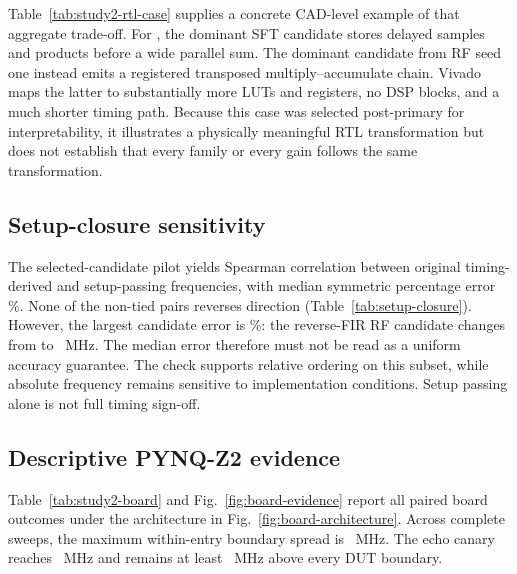 

Table~\ref{tab:study2-rtl-case} supplies a concrete CAD-level example of that
aggregate trade-off.  For , the dominant SFT
candidate stores delayed samples and products before a wide parallel sum.  The
dominant candidate from RF seed one instead emits a registered transposed
multiply--accumulate chain.  Vivado maps the latter to substantially more LUTs
and registers, no DSP blocks, and a much shorter timing path.  Because this
case was selected post-primary for interpretability, it illustrates
a physically meaningful RTL transformation but does not establish that every
family or every gain follows the same transformation.

\subsection{Setup-closure sensitivity}



The selected-candidate pilot yields Spearman correlation
 between original timing-derived and setup-passing
frequencies, with median symmetric percentage error
\%.  None of the
 non-tied pairs reverses direction
(Table~\ref{tab:setup-closure}).  However, the largest candidate error is
\%: the reverse-FIR RF candidate changes from
 to
~MHz.  The median error therefore must not be
read as a uniform accuracy guarantee.  The check supports relative ordering
on this subset, while absolute frequency remains sensitive to implementation
conditions.  Setup passing alone is not full timing sign-off.

\subsection{Descriptive PYNQ-Z2 evidence}

Table~\ref{tab:study2-board} and Fig.~\ref{fig:board-evidence} report all paired board outcomes under the
architecture in Fig.~\ref{fig:board-architecture}.  Across
 complete sweeps, the maximum
within-entry boundary spread is ~MHz.  The echo
canary reaches ~MHz and remains at least
~MHz above every DUT boundary.


